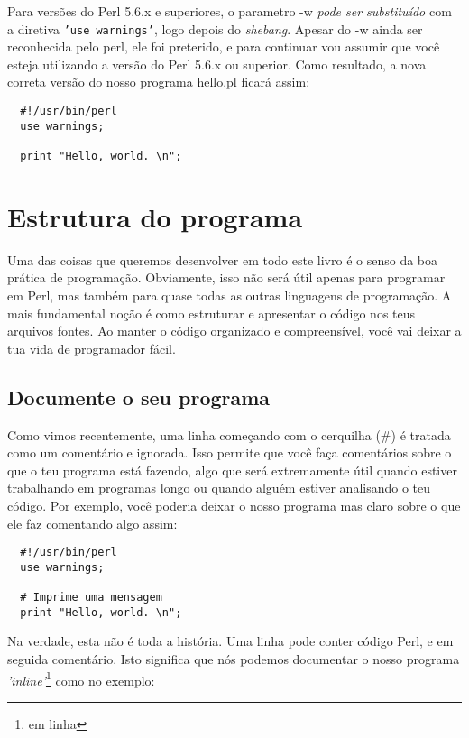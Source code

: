 \documentclass[a4paper,12pt,twoside]{book}
\begin{document}
\noindent Para versões do Perl 5.6.x e superiores, o parametro -w \textit{pode ser substituído}
com a diretiva \texttt{'use warnings'}, logo depois do \textit{shebang}. 
Apesar do -w ainda ser reconhecida pelo perl, ele foi preterido, 
e para continuar vou assumir que você esteja utilizando a versão do Perl 5.6.x ou superior.
Como resultado, a nova correta versão do nosso programa hello.pl ficará assim:\medskip

\begin{lstlisting}
  #!/usr/bin/perl
  use warnings;

  print "Hello, world. \n";
\end{lstlisting}

\section{Estrutura do programa}

\noindent Uma das coisas que queremos desenvolver em todo este livro é o 
senso da boa prática de programação. Obviamente, isso não será útil apenas 
para programar em Perl, mas também para quase todas as outras linguagens 
de programação. A mais fundamental noção é como estruturar e apresentar 
o código nos teus arquivos fontes. Ao manter o código organizado e 
compreensível, você vai deixar a tua vida de programador fácil.\medskip

\subsection{Documente o seu programa}

\noindent Como vimos recentemente, uma linha começando com o cerquilha (\#) é 
tratada como um comentário e ignorada. Isso permite que você faça comentários 
sobre o que o teu programa está fazendo, algo que será extremamente útil quando 
estiver trabalhando em programas longo ou quando alguém estiver analisando 
o teu código. Por exemplo, você poderia deixar o nosso programa mas claro 
sobre o que ele faz comentando algo assim:

\begin{lstlisting}
  #!/usr/bin/perl
  use warnings;

  # Imprime uma mensagem
  print "Hello, world. \n";
\end{lstlisting}

\noindent Na verdade, esta não é toda a história. Uma linha pode conter código 
Perl, e em seguida comentário. Isto significa que nós podemos documentar o nosso
programa \textit{'inline'}\footnote{em linha} como no exemplo:
\end{document}
